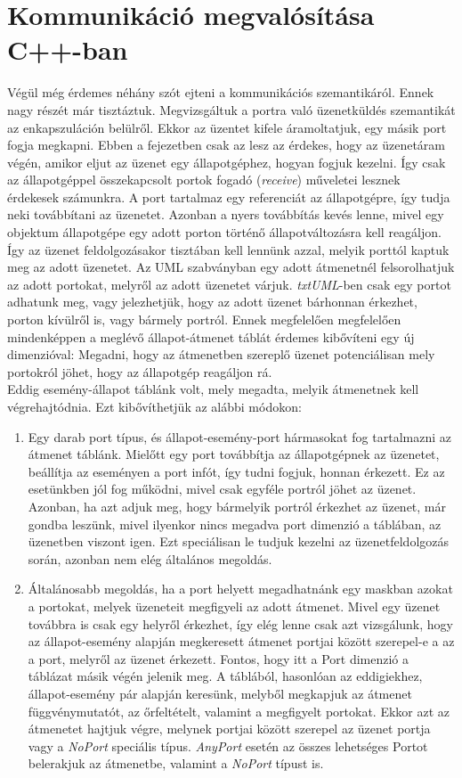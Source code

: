 \documentclass[a4paper,12pt]{report}
\begin{document}
\section{Kommunikáció megvalósítása C++-ban}
Végül még érdemes néhány szót ejteni a kommunikációs szemantikáról. Ennek nagy részét már tisztáztuk. Megvizsgáltuk a portra való üzenetküldés szemantikát az enkapszuláción belülről. Ekkor az üzentet kifele áramoltatjuk, egy másik port fogja megkapni. Ebben a fejezetben csak az lesz az érdekes, hogy az üzenetáram végén, amikor eljut az üzenet egy állapotgéphez, hogyan fogjuk kezelni. Így csak az állapotgéppel összekapcsolt portok fogadó (\textit{receive}) műveletei lesznek érdekesek számunkra. A port tartalmaz egy referenciát az állapotgépre, így tudja neki továbbítani az üzenetet. Azonban a nyers továbbítás kevés lenne, mivel egy objektum állapotgépe egy adott porton történő állapotváltozásra kell reagáljon. Így az üzenet feldolgozásakor tisztában kell lennünk azzal, melyik porttól kaptuk meg az adott üzenetet. Az UML szabványban egy adott átmenetnél felsorolhatjuk az adott portokat, melyről az adott üzenetet várjuk. \textit{txtUML}-ben csak egy portot adhatunk meg, vagy jelezhetjük, hogy az adott üzenet bárhonnan érkezhet, porton kívülről is, vagy bármely portról. Ennek megfelelően megfelelően mindenképpen a meglévő állapot-átmenet táblát érdemes kibővíteni egy új dimenzióval: Megadni, hogy az átmenetben szereplő üzenet potenciálisan mely portokról jöhet, hogy az állapotgép reagáljon rá. \\
Eddig esemény-állapot táblánk volt, mely megadta, melyik átmenetnek kell végrehajtódnia. Ezt kibővíthetjük az alábbi módokon:
\begin{enumerate}
\item Egy darab port típus, és állapot-esemény-port hármasokat fog tartalmazni az átmenet táblánk. Mielőtt egy port továbbítja az állapotgépnek az üzenetet, beállítja az eseményen a port infót, így tudni fogjuk, honnan érkezett. Ez az esetünkben jól fog működni, mivel csak egyféle portról jöhet az üzenet. Azonban, ha azt adjuk meg, hogy bármelyik portról érkezhet az üzenet, már gondba leszünk, mivel ilyenkor nincs megadva port dimenzió a táblában, az üzenetben viszont igen. Ezt speciálisan le tudjuk kezelni az üzenetfeldolgozás során, azonban nem elég általános megoldás.
\item Általánosabb megoldás, ha a port helyett megadhatnánk egy maskban azokat a portokat, melyek üzeneteit megfigyeli az adott átmenet. Mivel egy üzenet továbbra is csak egy helyről érkezhet, így elég lenne csak azt vizsgálunk, hogy az állapot-esemény alapján megkeresett átmenet portjai között szerepel-e a az a port, melyről az üzenet érkezett. Fontos, hogy itt a Port dimenzió a táblázat másik végén jelenik meg. A táblából, hasonlóan az eddigiekhez, állapot-esemény pár alapján keresünk, melyből megkapjuk az átmenet függvénymutatót, az őrfeltételt, valamint a megfigyelt portokat. Ekkor azt az átmenetet hajtjuk végre, melynek portjai között szerepel az üzenet portja vagy a \textit{NoPort} speciális típus. \textit{AnyPort} esetén az összes lehetséges Portot belerakjuk az átmenetbe, valamint a \textit{NoPort} típust is.
\end{enumerate}
\end{document}
